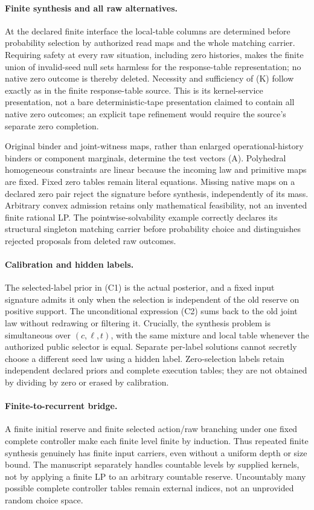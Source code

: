 \documentclass{article}
\begin{document}
\paragraph{Finite synthesis and all raw alternatives.}
At the declared finite interface the local-table columns are determined before probability selection by authorized read maps and the whole matching carrier. Requiring safety at every raw situation, including zero histories, makes the finite union of invalid-seed null sets harmless for the response-table representation; no native zero outcome is thereby deleted. Necessity and sufficiency of (K) follow exactly as in the finite response-table source. This is its kernel-service presentation, not a bare deterministic-tape presentation claimed to contain all native zero outcomes; an explicit tape refinement would require the source's separate zero completion.

Original binder and joint-witness maps, rather than enlarged operational-history binders or component marginals, determine the test vectors (A). Polyhedral homogeneous constraints are linear because the incoming law and primitive maps are fixed. Fixed zero tables remain literal equations. Missing native maps on a declared zero pair reject the signature before synthesis, independently of its mass. Arbitrary convex admission retains only mathematical feasibility, not an invented finite rational LP. The pointwise-solvability example correctly declares its structural singleton matching carrier before probability choice and distinguishes rejected proposals from deleted raw outcomes.

\paragraph{Calibration and hidden labels.}
The selected-label prior in (C1) is the actual posterior, and a fixed input signature admits it only when the selection is independent of the old reserve on positive support. The unconditional expression (C2) sums back to the old joint law without redrawing or filtering it. Crucially, the synthesis problem is simultaneous over $(c,\ell,t)$, with the same mixture and local table whenever the authorized public selector is equal. Separate per-label solutions cannot secretly choose a different seed law using a hidden label. Zero-selection labels retain independent declared priors and complete execution tables; they are not obtained by dividing by zero or erased by calibration.

\paragraph{Finite-to-recurrent bridge.}
A finite initial reserve and finite selected action/raw branching under one fixed complete controller make each finite level finite by induction. Thus repeated finite synthesis genuinely has finite input carriers, even without a uniform depth or size bound. The manuscript separately handles countable levels by supplied kernels, not by applying a finite LP to an arbitrary countable reserve. Uncountably many possible complete controller tables remain external indices, not an unprovided random choice space.
\end{document}
